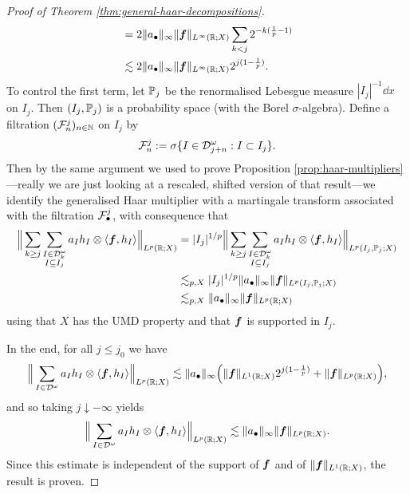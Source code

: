 \begin{proof}[Proof of Theorem \ref{thm:general-haar-decompositions}]
\begin{equation*}
\begin{aligned}
      &= 2\|a_{\bullet}\|_{\infty} \|\mb{f}\|_{L^\infty(\R;X)} \sum_{k < j} 2^{-k(\frac{1}{p} - 1)} \\
      &\lesssim 2\|a_{\bullet}\|_{\infty} \|\mb{f}\|_{L^\infty(\R;X)} 2^{j(1 - \frac{1}{p})}.
    \end{aligned}
  \end{equation*}
  To control the first term, let $\P_{j}$ be the renormalised Lebesgue measure $|I_{j}|^{-1} \dd x$ on $I_{j}$.
  Then $(I_{j},\P_{j})$ is a probability space (with the Borel $\sigma$-algebra).
  Define a filtration $(\mc{F}_{n}^{j})_{n \in \N}$ on $I_{j}$ by
  \begin{equation*}
    \mc{F}_{n}^{j} := \sigma\{I \in \mc{D}^{\omega}_{j+n} : I \subset I_{j}\}.
  \end{equation*}
  Then by the same argument we used to prove Proposition \ref{prop:haar-multipliers}---really we are just looking at a rescaled, shifted version of that result---we identify the generalised Haar multiplier with a martingale transform associated with the filtration $\mc{F}^{j}_{\bullet}$, with consequence that
  \begin{equation*}
    \begin{aligned}
      \Big\| \sum_{k \geq j} \sum_{\substack{I \in \mc{D}_{k}^{\omega} \\ I \subseteq I_{j}}} a_{I} h_{I} \otimes \langle \mb{f}, h_{I} \rangle \Big\|_{L^p(\R;X)}
      &=  |I_{j}|^{1/p} \Big\| \sum_{k \geq j} \sum_{\substack{I \in \mc{D}_{k}^{\omega} \\ I \subseteq I_{j}}} a_{I} h_{I} \otimes \langle \mb{f}, h_{I} \rangle \Big\|_{L^p(I_{j}, \P_{j};X)} \\
      &\lesssim_{p,X} |I_{j}|^{1/p} \|a_{\bullet}\|_{\infty} \|\mb{f}\|_{L^p(I_{j},\P_{j};X)} \\
      &\lesssim_{p,X} \|a_{\bullet}\|_{\infty} \|\mb{f}\|_{L^p(\R;X)}
    \end{aligned}
  \end{equation*}
  using that $X$ has the UMD property and that $\mb{f}$ is supported in $I_{j}$.

  In the end, for all $j \leq j_{0}$ we have
  \begin{equation*}
    \Big\| \sum_{I \in \mc{D}^{\omega}} a_{I} h_{I} \otimes \langle \mb{f}, h_{I} \rangle \Big\|_{L^p(\R;X)}
    \lesssim \|a_{\bullet}\|_{\infty}\Big(\|\mb{f}\|_{L^1(\R;X)} 2^{j(1 - \frac{1}{p})} + \|\mb{f}\|_{L^p(\R;X)}\Big),
  \end{equation*}
  and so taking $j \downarrow -\infty$ yields
    \begin{equation*}
    \Big\| \sum_{I \in \mc{D}^{\omega}} a_{I} h_{I} \otimes \langle \mb{f}, h_{I} \rangle \Big\|_{L^p(\R;X)}
    \lesssim \|a_{\bullet}\|_{\infty}\|\mb{f}\|_{L^p(\R;X)}.
  \end{equation*}
  Since this estimate is independent of the support of $\mb{f}$ and of $\|\mb{f}\|_{L^1(\R;X)}$, the result is proven.
  
\end{proof}

